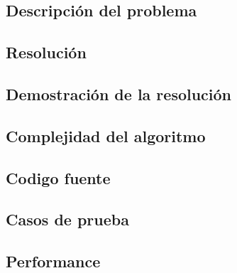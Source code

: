 \subsection{Descripci\'on del problema}

\subsection{Resoluci\'on}

\subsection{Demostraci\'on de la resoluci\'on}

\subsection{Complejidad del algoritmo}

\subsection{Codigo fuente}

\subsection{Casos de prueba}

\subsection{Performance}

